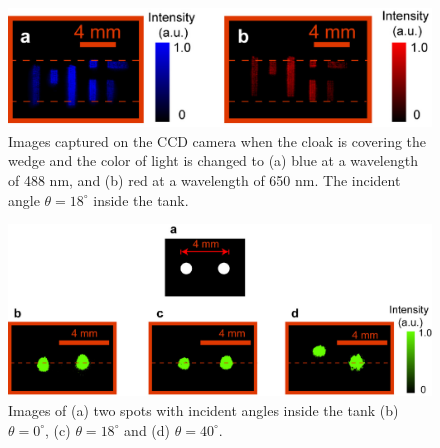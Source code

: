 \documentclass[preprint,preprintnumbers,amsmath,amssymb]{revtex4}
\begin{document}
\begin{figure}
\begin{centering}
\includegraphics[width=1\columnwidth,draft=false]{Fig_4}%
\caption{\label{fig:bluered} Images captured on the CCD camera
when the cloak is covering the wedge and the color of light is
changed to (a) blue at a wavelength of 488 nm, and (b) red at
a wavelength of 650 nm. The incident
angle $\theta = 18^{\circ}$ inside the tank.}
\end{centering}
\end{figure}

\pagebreak

\begin{figure}
\begin{centering}
\includegraphics[width=0.8\columnwidth,draft=false]{Fig_5}
\caption{\label{fig:twopoints} Images of (a) two spots with
incident angles inside the tank (b) $\theta=0^\circ$, (c) $\theta=18^\circ$ and (d) $\theta=40^\circ$.}
\end{centering}
\end{figure}
\end{document}
